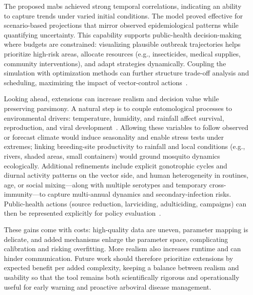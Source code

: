 The proposed \gls{mabs} achieved strong temporal correlations, indicating an ability to capture trends under varied initial conditions. The model proved effective for scenario-based projections that mirror observed epidemiological patterns while quantifying uncertainty. This capability supports public-health decision-making where budgets are constrained: visualizing plausible outbreak trajectories helps prioritize high-risk areas, allocate resources (e.g., insecticides, medical supplies, community interventions), and adapt strategies dynamically. Coupling the simulation with optimization methods can further structure trade-off analysis and scheduling, maximizing the impact of vector-control actions~\cite{araujo:2022,andrade:2021}.

Looking ahead, extensions can increase realism and decision value while preserving parsimony. A natural step is to couple entomological processes to environmental drivers: temperature, humidity, and rainfall affect survival, reproduction, and viral development~\cite{maneerat:2016,Abidemi2020,hamdan:2021}. Allowing these variables to follow observed or forecast climate would induce seasonality and enable stress tests under extremes; linking breeding-site productivity to rainfall and local conditions (e.g., rivers, shaded areas, small containers) would ground mosquito dynamics ecologically. Additional refinements include explicit gonotrophic cycles and diurnal activity patterns on the vector side, and human heterogeneity in routines, age, or social mixing—along with multiple serotypes and temporary cross-immunity—to capture multi-annual dynamics and secondary-infection risks. Public-health actions (source reduction, larviciding, adulticiding, campaigns) can then be represented explicitly for policy evaluation~\cite{Abidemi2020}.

These gains come with costs: high-quality data are uneven, parameter mapping is delicate, and added mechanisms enlarge the parameter space, complicating calibration and risking overfitting. More realism also increases runtime and can hinder communication. Future work should therefore prioritize extensions by expected benefit per added complexity, keeping a balance between realism and usability so that the tool remains both scientifically rigorous and operationally useful for early warning and proactive arboviral disease management.
